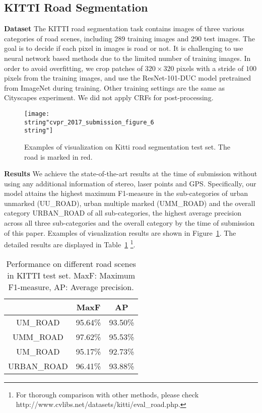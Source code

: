 \documentclass[10pt,twocolumn,letterpaper]{article}
\begin{document}
\subsection{KITTI Road Segmentation}
\textbf{Dataset} The KITTI road segmentation task contains images of three various categories of road scenes, including 289 training images and 290 test images. The goal is to decide if each pixel in images is road or not. It is challenging to use neural network based methods due to the limited number of training images. In order to avoid overfitting, we crop patches of $320 \times 320$ pixels with a stride of $100$ pixels from the training images, and use the ResNet-101-DUC model pretrained from ImageNet during training. Other training settings are the same as Cityscapes experiment. We did not apply CRFs for post-processing.
\begin{figure}[h]
\begin{center}
\texttt{[image: \\string"cvpr\_2017\_submission\_figure\_6\\string"]}
\end{center}
\caption{Examples of visualization on Kitti road segmentation test set. The road is marked in red.}
\label{Figure6_kitti}
\vspace{-7pt}
\end{figure}

\textbf{Results} We achieve the state-of-the-art results at the time of submission without using any additional information of stereo, laser points and GPS. Specifically, our model attains the highest maximum F1-measure in the sub-categories of  urban unmarked ({UU\_ROAD}), urban multiple marked ({UMM\_ROAD}) and the overall category {URBAN\_ROAD} of all sub-categories, the highest average precision across all three sub-categories and the overall category by the time of submission of this paper. Examples of visualization results are shown in Figure~\ref{Figure6_kitti}. The detailed results are displayed in Table~\ref{tab:kitti} \footnote{For thorough comparison with other methods, please check http://www.cvlibs.net/datasets/kitti/eval\_road.php.}.

\begin{table}[ht]
\begin{center}
\begin{tabular}{c|cc} \toprule[1.5pt]
    & MaxF & AP\\ \midrule{UM\_ROAD} & 95.64\% &	93.50\% \\
  {UMM\_ROAD} & 97.62\% & 95.53\% \\
  {UM\_ROAD} & 95.17\% &	92.73\% \\ \midrule[1.25pt]{URBAN\_ROAD} & 96.41\% & 93.88\% \\ \bottomrule[1.5pt]
\end{tabular}
\vspace{2pt}
\caption{Performance on different road scenes in KITTI test set. MaxF: Maximum F1-measure, AP: Average precision.}
\label{tab:kitti} 
\end{center}
\vspace{-15pt}
\end{table}
\end{document}
